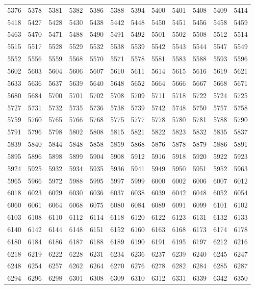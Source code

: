 \begin{center}
\begin{longtable}{llllllllllll}
5376 &5378 &5381 &5382 &5386 &5388 &5394 &5400 &5401 &5408 &5409 &5414 \\
5418 &5427 &5428 &5430 &5438 &5442 &5448 &5450 &5451 &5456 &5458 &5459 \\
5463 &5470 &5471 &5488 &5490 &5491 &5492 &5501 &5502 &5508 &5512 &5514 \\
5515 &5517 &5528 &5529 &5532 &5538 &5539 &5542 &5543 &5544 &5547 &5549 \\
5552 &5556 &5559 &5568 &5570 &5571 &5578 &5581 &5583 &5588 &5593 &5596 \\
5602 &5603 &5604 &5606 &5607 &5610 &5611 &5614 &5615 &5616 &5619 &5621 \\
5633 &5636 &5637 &5639 &5640 &5648 &5652 &5664 &5666 &5667 &5668 &5671 \\
5680 &5684 &5700 &5701 &5702 &5708 &5709 &5711 &5718 &5722 &5724 &5725 \\
5727 &5731 &5732 &5735 &5736 &5738 &5739 &5742 &5748 &5750 &5757 &5758 \\
5759 &5760 &5765 &5766 &5768 &5775 &5777 &5778 &5780 &5781 &5788 &5790 \\
5791 &5796 &5798 &5802 &5808 &5815 &5821 &5822 &5823 &5832 &5835 &5837 \\
5839 &5840 &5844 &5848 &5858 &5859 &5868 &5876 &5878 &5879 &5886 &5891 \\
5895 &5896 &5898 &5899 &5904 &5908 &5912 &5916 &5918 &5920 &5922 &5923 \\
5924 &5925 &5932 &5934 &5935 &5936 &5941 &5949 &5950 &5951 &5952 &5963 \\
5965 &5966 &5972 &5988 &5995 &5997 &5999 &6000 &6002 &6006 &6007 &6012 \\
6018 &6023 &6029 &6030 &6036 &6037 &6038 &6039 &6042 &6048 &6052 &6054 \\
6060 &6061 &6064 &6068 &6075 &6080 &6084 &6089 &6091 &6099 &6101 &6102 \\
6103 &6108 &6110 &6112 &6114 &6118 &6120 &6122 &6123 &6131 &6132 &6133 \\
6140 &6142 &6144 &6148 &6151 &6152 &6160 &6163 &6168 &6173 &6174 &6178 \\
6180 &6184 &6186 &6187 &6188 &6189 &6190 &6191 &6195 &6197 &6212 &6216 \\
6218 &6219 &6222 &6228 &6231 &6234 &6236 &6237 &6239 &6240 &6245 &6247 \\
6248 &6254 &6257 &6262 &6264 &6270 &6276 &6278 &6282 &6284 &6285 &6287 \\
6294 &6296 &6298 &6301 &6308 &6309 &6310 &6312 &6331 &6339 &6342 &6350 \\

\end{longtable}
\end{center}
